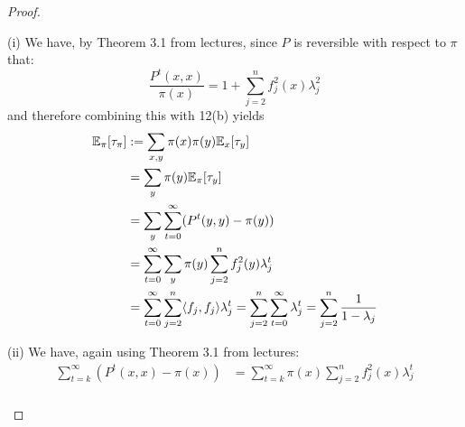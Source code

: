 \documentclass[a4paper]{article}
\begin{document}
	\begin{proof}
	\begin{description}
	\item (i) We have, by Theorem 3.1 from lectures, since $P$ is reversible with respect to $\pi$ that:
	\[\frac{P^t(x,x)}{\pi (x)} = 1 + \sum_{j=2}^n{f_j^2 (x)\lambda_j^2}\]
	and therefore combining this with 12(b) yields
	\begin{align*}
	\E_{\pi}[\tau_{\pi}] &:= \sum_{x,y}\pi (x) \pi (y) \E_{x}[\tau_{y}]\\
	&=\sum_{y}\pi (y) \E_{\pi}[\tau_y]\\
	&=\sum_{y}\sum_{t=0}^{\infty} (P^t(y,y)-\pi (y))\\
	&=\sum_{t=0}^{\infty}\sum_{y} \pi (y)\sum_{j=2}^n {f_j^2 (y) \lambda_j^t }\\
	&=\sum_{t=0}^{\infty}\sum_{j=2}^n\langle f_j, f_j \rangle \lambda_j^t =\sum_{j=2}^n\sum_{t=0}^{\infty} \lambda_j^t =\sum_{j=2}^n \frac{1}{1-\lambda_j}	
	\end{align*}
	
	\item (ii) We have, again using Theorem 3.1 from lectures:
	\begin{align*}
	\sum_{t = k}^{\infty} (P^t(x,x) - \pi (x)) &= \sum_{t = k}^{\infty} \pi (x) \sum_{j=2}^n f_j^2(x) \lambda_j^t\\	
	\end{align*}
	
	\end{description}
	\end{proof}
	
\end{document}
